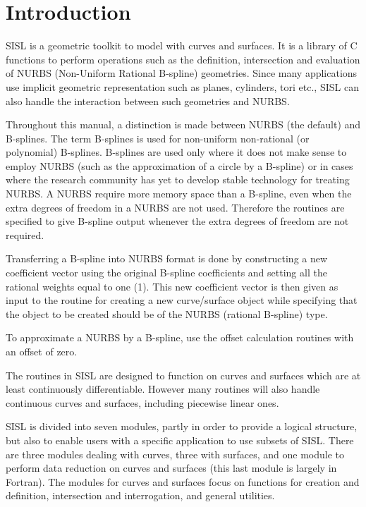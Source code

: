 \chapter{Introduction}
\label{introduction}
SISL is a geometric toolkit to model with curves and surfaces. It is a
library of C functions to perform operations such as the definition,
intersection and evaluation of NURBS (Non-Uniform Rational B-spline)
geometries. Since many applications use implicit geometric
representation such as planes, cylinders, tori etc., SISL can also
handle the interaction between such geometries and NURBS.

\medskip
Throughout this manual, a distinction is made between NURBS (the
default) and B-splines. The term B-splines is used for non-uniform
non-rational (or polynomial) B-splines. B-splines are used only where it
does not make sense to employ NURBS (such as the approximation of a
circle by a B-spline) or in cases where the research
community has yet to develop stable technology for treating NURBS.
A NURBS require more memory space than a B-spline, even when the
extra degrees of freedom in a NURBS are not used. Therefore the routines
are specified to give B-spline output whenever the extra degrees of
freedom are not required.

Transferring a B-spline into NURBS format is done by constructing a new
coefficient vector using the original B-spline coefficients and setting
all the rational weights equal to one (1).
This new coefficient vector is then given as input to the routine for
creating a new curve/surface object while specifying that the object to
be created should be of the NURBS (rational B-spline) type.

To approximate a NURBS by a B-spline, use the offset calculation
routines with an offset of zero.

The routines in SISL are designed to function on curves and surfaces
which are at least continuously differentiable. However many routines
will also handle continuous curves and surfaces, including piecewise
linear ones.

\medskip
SISL is divided into seven modules, partly in order to provide a logical
structure, but also to enable users with a specific application to use
subsets of SISL. There are three modules dealing with curves, three with
surfaces, and one module to perform data reduction on curves and
surfaces (this last module is largely in Fortran). The modules for
curves and surfaces focus on functions for creation and definition,
intersection and interrogation, and general utilities.

